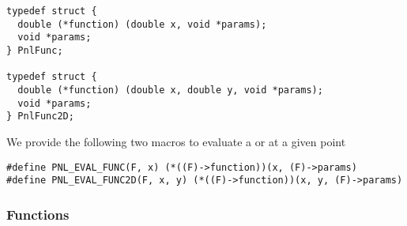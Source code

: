 \begin{verbatim}
typedef struct {
  double (*function) (double x, void *params);
  void *params;
} PnlFunc;

typedef struct {
  double (*function) (double x, double y, void *params);
  void *params;
} PnlFunc2D;
\end{verbatim}

We provide the following two macros to evaluate a  or
 at a given point
\begin{verbatim}
#define PNL_EVAL_FUNC(F, x) (*((F)->function))(x, (F)->params)
#define PNL_EVAL_FUNC2D(F, x, y) (*((F)->function))(x, y, (F)->params)
\end{verbatim}



\subsubsection{Functions}


